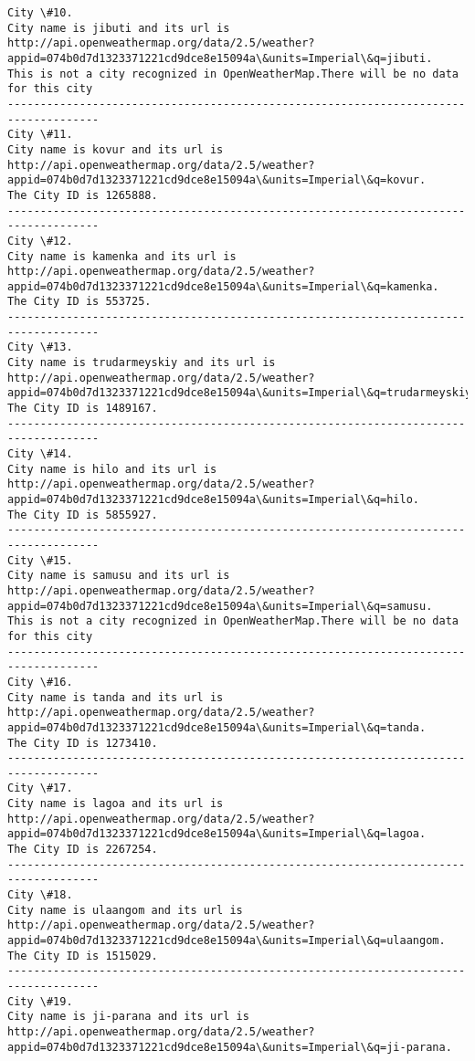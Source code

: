\documentclass[11pt]{article}
\begin{document}
\begin{Verbatim}[commandchars=\\\{\}]
City \#10.
City name is jibuti and its url is http://api.openweathermap.org/data/2.5/weather?appid=074b0d7d1323371221cd9dce8e15094a\&units=Imperial\&q=jibuti.
This is not a city recognized in OpenWeatherMap.There will be no data for this city
------------------------------------------------------------------------------------
City \#11.
City name is kovur and its url is http://api.openweathermap.org/data/2.5/weather?appid=074b0d7d1323371221cd9dce8e15094a\&units=Imperial\&q=kovur.
The City ID is 1265888.
------------------------------------------------------------------------------------
City \#12.
City name is kamenka and its url is http://api.openweathermap.org/data/2.5/weather?appid=074b0d7d1323371221cd9dce8e15094a\&units=Imperial\&q=kamenka.
The City ID is 553725.
------------------------------------------------------------------------------------
City \#13.
City name is trudarmeyskiy and its url is http://api.openweathermap.org/data/2.5/weather?appid=074b0d7d1323371221cd9dce8e15094a\&units=Imperial\&q=trudarmeyskiy.
The City ID is 1489167.
------------------------------------------------------------------------------------
City \#14.
City name is hilo and its url is http://api.openweathermap.org/data/2.5/weather?appid=074b0d7d1323371221cd9dce8e15094a\&units=Imperial\&q=hilo.
The City ID is 5855927.
------------------------------------------------------------------------------------
City \#15.
City name is samusu and its url is http://api.openweathermap.org/data/2.5/weather?appid=074b0d7d1323371221cd9dce8e15094a\&units=Imperial\&q=samusu.
This is not a city recognized in OpenWeatherMap.There will be no data for this city
------------------------------------------------------------------------------------
City \#16.
City name is tanda and its url is http://api.openweathermap.org/data/2.5/weather?appid=074b0d7d1323371221cd9dce8e15094a\&units=Imperial\&q=tanda.
The City ID is 1273410.
------------------------------------------------------------------------------------
City \#17.
City name is lagoa and its url is http://api.openweathermap.org/data/2.5/weather?appid=074b0d7d1323371221cd9dce8e15094a\&units=Imperial\&q=lagoa.
The City ID is 2267254.
------------------------------------------------------------------------------------
City \#18.
City name is ulaangom and its url is http://api.openweathermap.org/data/2.5/weather?appid=074b0d7d1323371221cd9dce8e15094a\&units=Imperial\&q=ulaangom.
The City ID is 1515029.
------------------------------------------------------------------------------------
City \#19.
City name is ji-parana and its url is http://api.openweathermap.org/data/2.5/weather?appid=074b0d7d1323371221cd9dce8e15094a\&units=Imperial\&q=ji-parana.

\end{Verbatim}
\end{document}
